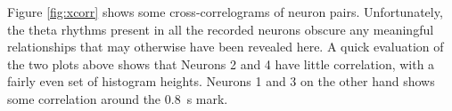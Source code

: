 \documentclass[a4paper, 10pt]{article}
\begin{document}
Figure \ref{fig:xcorr} shows some cross-correlograms of neuron
pairs. Unfortunately, the theta rhythms present in all the recorded neurons
obscure any meaningful relationships that may otherwise have been revealed
here. A quick evaluation of the two plots above shows that Neurons 2 and 4 have
little correlation, with a fairly even set of histogram heights. Neurons 1 and 3
on the other hand shows some correlation around the \SI{0.8}{\second} mark.









\end{document}
